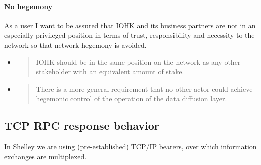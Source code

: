 \documentclass[11pt,a4paper]{article}
\begin{document}
\paragraph{No hegemony}

As a user I want to be assured that IOHK and its business partners are
not in an especially privileged position in terms of trust,
responsibility and necessity to the network so that network hegemony is
avoided.

\begin{itemize}
\item
  \begin{quote}
  IOHK should be in the same position on the network as any other
  stakeholder with an equivalent amount of stake.
  \end{quote}
\item
  \begin{quote}
  There is a more general requirement that no other actor could achieve
  hegemonic control of the operation of the data diffusion layer.
  \end{quote}
\end{itemize}

\subsection{TCP RPC response behavior}
\label{tcp-rpc-response-behavior}

In Shelley we are using (pre-established) TCP/IP bearers, over which
information exchanges are multiplexed.
\end{document}
